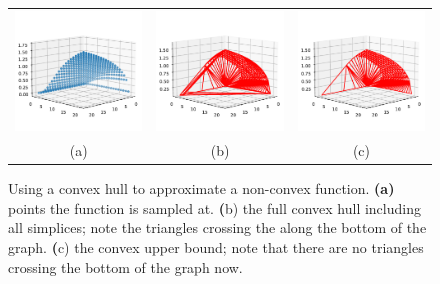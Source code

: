 \documentclass{article}
\begin{document}
\begin{figure}
  \centering
  \begin{tabular}{ccc}
  \includegraphics[width=2in]{imgs/iwasa1984_hull_samples.pdf} &
  \includegraphics[width=2in]{imgs/iwasa1984_hull_full.pdf} &
  \includegraphics[width=2in]{imgs/iwasa1984_hull_upper.pdf} \\
  (a) & (b) & (c)
  \end{tabular}
  \caption{Using a convex hull to approximate a non-convex function. \textbf{(a)} points the function is sampled at. \textbf({b}) the full convex hull including all simplices; note the triangles crossing the along the bottom of the graph. \textbf({c}) the convex upper bound; note that there are no triangles crossing the bottom of the graph now. \label{fig:iwasa-hull}}
\end{figure}
\end{document}
